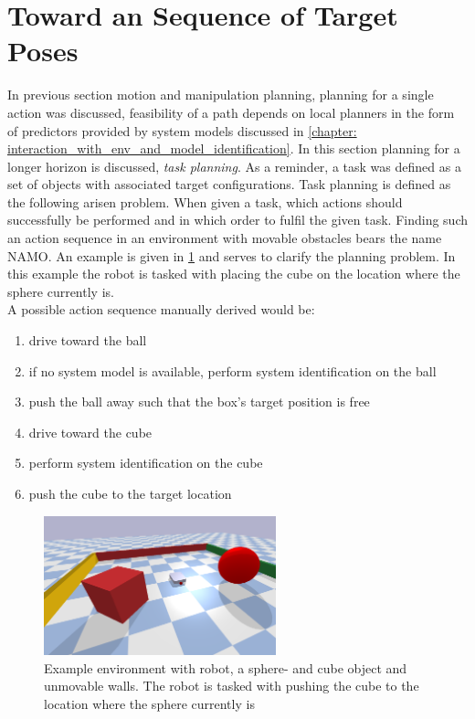 \section{Toward an Sequence of Target Poses}
\label{section: toward_sequence_target_poses}
In previous section motion and manipulation planning, planning for a single action was discussed, feasibility of a path depends on local planners in the form of predictors provided by system models discussed in \cref{chapter: interaction_with_env_and_model_identification}. In this section planning for a longer horizon is discussed, \textit{task planning}. As a reminder, a task was defined as a set of objects with associated target configurations. Task planning is defined as the following arisen problem. When given a task, which actions should successfully be performed and in which order to fulfil the given task. Finding such an action sequence in an environment with movable obstacles bears the name \ac{NAMO}. An example is given in \cref{figure: example_task_planning} and serves to clarify the planning problem. In this example the robot is tasked with placing the cube on the location where the sphere currently is.\\

A possible action sequence manually derived would be:\\

\begin{enumerate}
\item drive toward the ball
    \item if no system model is available, perform system identification on the ball
    \item push the ball away such that the box's target position is free 
    \item drive toward the cube
    \item perform system identification on the cube 
    \item push the cube to the target location
    \end{enumerate}
    
\begin{figure}[H]
    \centering
    \includegraphics[width=0.6\textwidth]{figures/task_swap_location_balls.png}
    \caption{Example environment with robot, a sphere- and cube object and unmovable walls. The robot is tasked with pushing the cube to the location where the sphere currently is }
  \label{figure: example_task_planning}
\end{figure}

